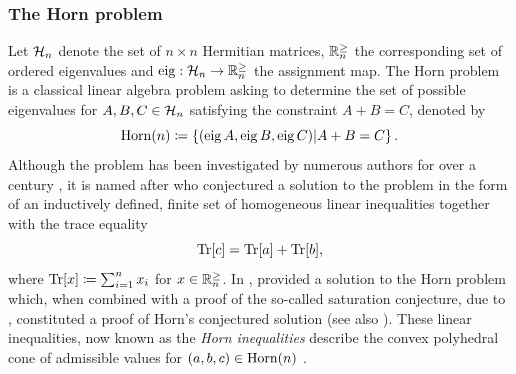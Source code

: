 \documentclass[notitlepage, 11pt, letterpaper]{amsart}
\begin{document}
\subsubsection*{The Horn problem}
Let $\mathcal H_{n}$ denote the set of $n\times n$ Hermitian matrices, $\mathbb R^{\geq}_{n}$ the corresponding set of ordered eigenvalues and $\operatorname{eig} : \mathcal H_{n} \to \mathbb R^{\geq}_{n}$ the assignment map.
The Horn problem is a classical linear algebra problem asking to determine the set of possible eigenvalues for $A,B,C \in \mathcal H_{n}$ satisfying the constraint $A+B=C$, denoted by
\begin{equation}
    \operatorname{Horn}(n) \coloneqq \left\{ (\operatorname{eig} A, \operatorname{eig} B, \operatorname{eig} C) \middle| A + B = C \right\}.
\end{equation}
Although the problem has been investigated by numerous authors for over a century \cite{weyl1912asymptotische,fan1949theorem,lidskii1953proper,wielandt1955extremum,thompson1971eigenvalues,thompson1970eigenvalues}, it is named after \citeauthor{horn1962eigenvalues} who conjectured a solution to the problem in the form of an inductively defined, finite set of homogeneous linear inequalities \cite{horn1962eigenvalues} together with the trace equality
\begin{equation}
    \operatorname{Tr}[c] = \operatorname{Tr}[a] + \operatorname{Tr}[b],
\end{equation}
where $\operatorname{Tr}[x] \coloneqq \sum_{i=1}^{n} x_i$ for $x \in \mathbb R^{\geq}_{n}$.
In \citeyear{klyachko1998stable}, \citeauthor{klyachko1998stable} provided a solution to the Horn problem \cite{klyachko1998stable} which, when combined with a proof of the so-called saturation conjecture, due to \citeauthor{knutson1999honeycomb} \cite{knutson1999honeycomb}, constituted a proof of Horn's conjectured solution \cite{fulton1998eigenvalues} (see also \cite{alekseev2017symplectic}).
These linear inequalities, now known as the \textit{Horn inequalities} describe the convex polyhedral cone of admissible values for $(a,b,c) \in \operatorname{Horn}(n)$ \cite{bhatia2001linear,knutson2000symplectic,fulton2000eigenvalues,niculescu2006convex}.
\end{document}
